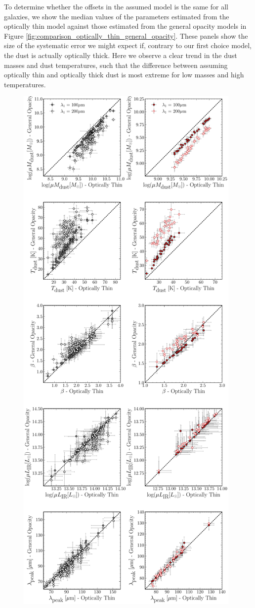 To determine whether the offsets in the assumed model is the same for all galaxies, we show the median values of the parameters estimated from the optically thin model against those estimated from the general opacity models in Figure \ref{fig:comparison_optically_thin_general_opacity}. These panels show the size of the systematic error we might expect if, contrary to our first choice model, the dust is actually optically thick. Here we observe a clear trend in the dust masses and dust temperatures, such that the difference between assuming optically thin and optically thick dust is most extreme for low masses and high temperatures.

\begin{figure}
	\centering
	\includegraphics[height=0.9\textheight]{Figures/optically_thin_against_general_opacity.pdf}

\end{figure}
